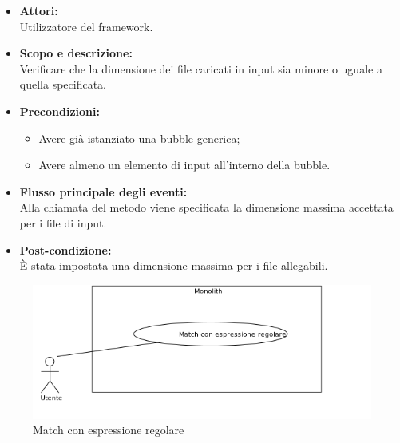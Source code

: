 \begin{itemize}
	\item \textbf{Attori:}
	\\Utilizzatore del framework.
	\item \textbf{Scopo e descrizione:} 
	\\Verificare che la dimensione dei file caricati in input sia minore o uguale a quella specificata.
	\item \textbf{Precondizioni:}
	\begin{itemize}
		\item Avere già istanziato una bubble generica;
		\item Avere almeno un elemento di input all'interno della bubble.
	\end{itemize}
	\item \textbf{Flusso principale degli eventi:}
	\\Alla chiamata del metodo viene specificata la dimensione massima accettata per i file di input.
	\item \textbf{Post-condizione:}
	\\È stata impostata una dimensione massima per i file allegabili.
\end{itemize}


\begin{figure}[H]
	\centering
	\includegraphics[width=15cm]{../../documenti/AnalisiDeiRequisiti/Diagrammi_img/uc1_10.png}
	\caption{\UCCaption{} Match con espressione regolare}
\end{figure}

